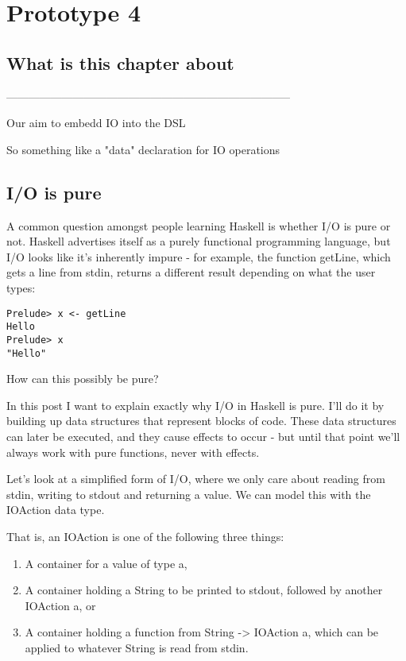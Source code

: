 \documentclass[thesis-solanki.tex]{subfiles}
\begin{document}
\chapter{Prototype 4}{\label{proto4}}


\section{What is this chapter about}

-----------------------------------------------------------------------------

Our aim to embedd IO into the DSL

So something like a "data" declaration for IO operations

\section{I/O is pure}

\cite{website:ioispurechristaylor}

A common question amongst people learning Haskell is whether I/O is pure or not. Haskell advertises itself as a purely functional 
programming language, but I/O looks like it’s inherently impure - for example, the function getLine, which gets a line from stdin, returns 
a different result depending on what the user types:

\begin{verbatim}
Prelude> x <- getLine
Hello
Prelude> x
"Hello"
\end{verbatim}

How can this possibly be pure?

In this post I want to explain exactly why I/O in Haskell is pure. I’ll do it by building up data structures that represent blocks of code. 
These data structures can later be executed, and they cause effects to occur - but until that point we’ll always work with pure functions, 
never with effects.

Let’s look at a simplified form of I/O, where we only care about reading from stdin, writing to stdout and returning a value. We can model 
this with the IOAction data type.

That is, an IOAction is one of the following three things:
\begin{enumerate}
\item A container for a value of type a,

\item A container holding a String to be printed to stdout, followed by another IOAction a, or

\item A container holding a function from String -> IOAction a, which can be applied to whatever String is read from stdin.
\end{enumerate}
\end{document}
